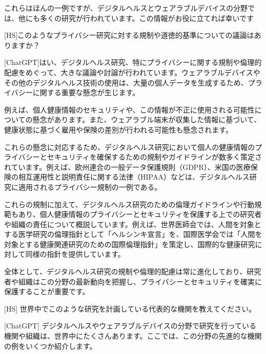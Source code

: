 \documentclass[
]{bxjsbook}
\theoremstyle{definition}
\theoremstyle{definition}
\theoremstyle{definition}
\theoremstyle{definition}
\theoremstyle{remark}
\begin{document}
これらはほんの一例ですが、デジタルヘルスとウェアラブルデバイスの分野では、他にも多くの研究が行われています。この情報がお役に立てれば幸いです

{[}HS{]}このようなプライバシー研究に対する規制や道徳的基準についての議論はありますか？

{[}ChatGPT{]}はい、デジタルヘルス研究、特にプライバシーに関する規制や倫理的配慮をめぐって、大きな議論や討論が行われています。ウェアラブルデバイスやその他のデジタルヘルス技術の使用は、大量の個人データを生成するため、プライバシーに関する重要な懸念が生じます。

例えば、個人健康情報のセキュリティや、この情報が不正に使用される可能性についての懸念があります。また、ウェアラブル端末が収集した情報に基づいて、健康状態に基づく雇用や保険の差別が行われる可能性も懸念されます。

これらの懸念に対応するため、デジタルヘルス研究において個人の健康情報のプライバシーとセキュリティを確保するための規制やガイドラインが数多く策定されています。例えば、欧州連合の一般データ保護規則（GDPR）、米国の医療保険の相互運用性と説明責任に関する法律（HIPAA）などは、デジタルヘルス研究に適用されるプライバシー規制の一例である。

これらの規制に加えて、デジタルヘルス研究のための倫理ガイドラインや行動規範もあり、個人健康情報のプライバシーとセキュリティを保護する上での研究者や組織の責任について概説しています。例えば、世界医師会では、人間を対象とする医学研究の倫理指針として「ヘルシンキ宣言」を、国際医学会では「人間を対象とする健康関連研究のための国際倫理指針」を策定し、国際的な健康研究に対して同様の指針を提供しています。

全体として、デジタルヘルス研究の規制や倫理的配慮は常に進化しており、研究者や組織はこの分野の最新動向を把握し、プライバシーとセキュリティを確実に保護することが重要です。

{[}HS{]} 世界中でこのような研究を計画している代表的な機関を教えてください。

{[}ChatGPT{]} デジタルヘルスやウェアラブルデバイスの分野で研究を行っている機関や組織は、世界中にたくさんあります。ここでは、この分野の先進的な機関の例をいくつか紹介します。
\end{document}
